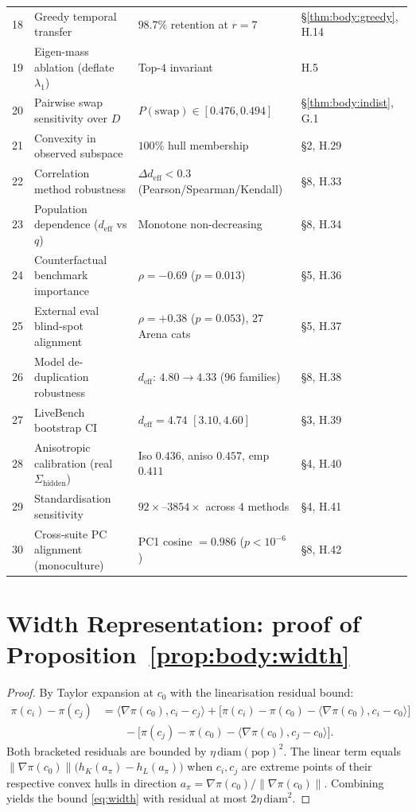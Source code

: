 \documentclass{article}
\begin{document}
\begin{table}[h]
\begin{tabular}{rlll}
18 & Greedy temporal transfer & $98.7\%$ retention at $r = 7$ & \S\ref{thm:body:greedy}, H.14 \\
19 & Eigen-mass ablation (deflate $\lambda_1$) & Top-$4$ invariant & H.5 \\
20 & Pairwise swap sensitivity over $D$ & $P(\text{swap}) \in [0.476, 0.494]$ & \S\ref{thm:body:indist}, G.1 \\
21 & Convexity in observed subspace & $100\%$ hull membership & \S2, H.29 \\
22 & Correlation method robustness & $\Delta d_{\mathrm{eff}} < 0.3$ (Pearson/Spearman/Kendall) & \S8, H.33 \\
23 & Population dependence ($d_{\mathrm{eff}}$ vs $q$) & Monotone non-decreasing & \S8, H.34 \\
24 & Counterfactual benchmark importance & $\rho = -0.69$ ($p = 0.013$) & \S5, H.36 \\
25 & External eval blind-spot alignment & $\rho = +0.38$ ($p = 0.053$), $27$ Arena cats & \S5, H.37 \\
26 & Model de-duplication robustness & $d_{\mathrm{eff}}$: $4.80 \to 4.33$ ($96$ families) & \S8, H.38 \\
27 & LiveBench bootstrap CI & $d_{\mathrm{eff}} = 4.74$ $[3.10, 4.60]$ & \S3, H.39 \\
28 & Anisotropic calibration (real $\Sigma_{\mathrm{hidden}}$) & Iso $0.436$, aniso $0.457$, emp $0.411$ & \S4, H.40 \\
29 & Standardisation sensitivity & $92\times$--$3854\times$ across $4$ methods & \S4, H.41 \\
30 & Cross-suite PC alignment (monoculture) & PC1 cosine $= 0.986$ ($p < 10^{-6}$) & \S8, H.42 \\
\bottomrule
\end{tabular}
\end{table}

\section{Width Representation: proof of Proposition~\ref{prop:body:width}}
\label{app:width}

\begin{proof}
By Taylor expansion at $c_0$ with the linearisation residual bound:
\begin{align*}
\pi(c_i) - \pi(c_j)
  &= \langle \nabla \pi(c_0), c_i - c_j \rangle
     + \big[\pi(c_i) - \pi(c_0) - \langle \nabla\pi(c_0), c_i - c_0\rangle\big]\\
  &\qquad - \big[\pi(c_j) - \pi(c_0) - \langle \nabla\pi(c_0), c_j - c_0\rangle\big].
\end{align*}
Both bracketed residuals are bounded by $\eta\,\mathrm{diam}(\mathrm{pop})^2$.
The linear term equals $\|\nabla \pi(c_0)\|\big(h_K(a_\pi) - h_L(a_\pi)\big)$
when $c_i, c_j$ are extreme points of their respective convex hulls in
direction $a_\pi = \nabla\pi(c_0)/\|\nabla\pi(c_0)\|$. Combining yields
the bound \eqref{eq:width} with residual at most $2\eta\,\mathrm{diam}^2$.
\end{proof}
\end{document}
